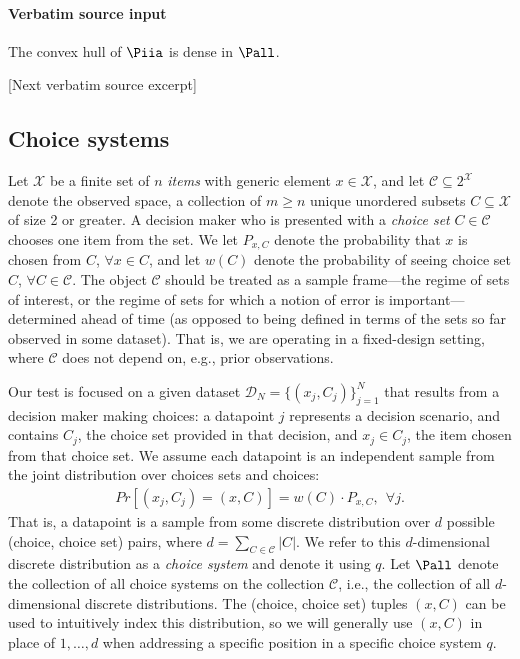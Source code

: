\documentclass[10pt]{article}
\begin{document}
\paragraph{Verbatim source input}
\begin{ReviewVerbatim}
\begin{fact}\label{cvx_hull_dense}
			The convex hull of $\Piia$ is dense in $\Pall$.
		\end{fact}

[Next verbatim source excerpt]

	\subsection{Choice systems}\label{subsection:choice_system}
	Let $\mathcal{X}$ be a finite set of $n$ \textit{items} with generic element $x \in \mathcal{X}$, and let $\mathcal{C} \subseteq 2^\mathcal{X}$ denote the observed space, a collection of $m \geq n$ unique unordered subsets $C \subseteq \mathcal{X}$ of size 2 or greater. A decision maker who is presented with a \textit{choice set} $C \in \mathcal{C}$ chooses one item from the set. We let $P_{x,C}$ denote the probability that $x$ is chosen from $C$, $\forall x \in C$, and let $w(C)$ denote the probability of seeing choice set $C$, $\forall C \in \mathcal{C}$. The object $\mathcal{C}$ should be treated as a sample frame---the regime of sets of interest, or the regime of sets for which a notion of error is important---determined ahead of time (as opposed to being defined in terms of the sets so far observed in some dataset). That is, we are operating in a fixed-design setting, where $\mathcal{C}$ does not depend on, e.g., prior observations.

	Our test is focused on a given dataset $\mathcal{D}_N = \lbrace (x_j, C_j) \rbrace_{j=1}^N$ that results from a decision maker making choices: a datapoint $j$ represents a decision scenario, and contains $C_j$, the choice set provided in that decision, and $x_j \in C_j$, the item chosen from that choice set. We assume each datapoint is an independent sample from the joint distribution over choices sets and choices:
	\begin{align*}
	Pr[(x_j, C_j) = (x, C)] = w(C) \cdot P_{x,C}, \ \ \forall j.
	\end{align*}
	That is, a datapoint is a sample from some discrete distribution over $d$ possible (choice, choice set) pairs, where $d = \sum_{C \in \mathcal{C}} |C|$. We refer to this $d$-dimensional discrete distribution as a \textit{choice system} and denote it using $q$.
	Let $\Pall$ denote the collection of all choice systems on the collection $\mathcal{C}$, i.e., the collection of all $d$-dimensional discrete distributions. The (choice, choice set) tuples $(x,C)$ can be used to intuitively index this distribution, so we will generally use $(x,C)$ in place of $1,\ldots,d$ when addressing a specific position in a specific choice system $q$.



\end{ReviewVerbatim}
\end{document}
